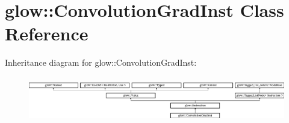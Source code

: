 \hypertarget{classglow_1_1_convolution_grad_inst}{}\section{glow\+:\+:Convolution\+Grad\+Inst Class Reference}
\label{classglow_1_1_convolution_grad_inst}
Inheritance diagram for glow\+:\+:Convolution\+Grad\+Inst\+:\begin{figure}[H]
\begin{center}
\leavevmode
\includegraphics[height=1.991111cm]{classglow_1_1_convolution_grad_inst}
\end{center}
\end{figure}

